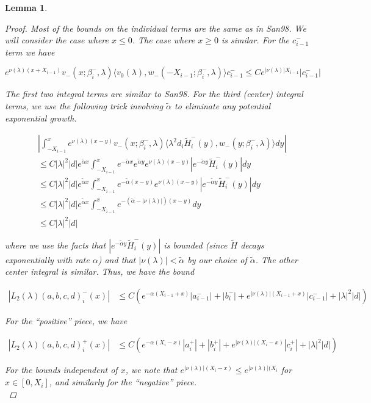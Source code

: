 \documentclass[12pt]{article}
\newtheorem{lemma}{Lemma}
\begin{document}
\begin{lemma}
\begin{proof}
Most of the bounds on the individual terms are the same as in San98. We will consider the case where $x \leq 0$. The case where $x \geq 0$ is similar. For the $c_{i-1}^-$ term we have

\[
e^{\nu(\lambda)(x+X_{i-1})} v_-(x; \beta_i^-, \lambda) \langle v_0(\lambda), w_-(-X_{i-1}; \beta_i^-, \lambda) \rangle c_{i-1}^- \leq C e^{|\nu(\lambda)| X_{i-1} }|c_{i-1}^-|
\]

The first two integral terms are similar to San98. For the third (center) integral terms, we use the following trick involving $\tilde{\alpha}$ to eliminate any potential exponential growth.

\begin{align*}
&\left| \int_{-X_{i-1}}^x 
e^{\nu(\lambda)(x-y)} v_-(x; \beta_i^-, \lambda) \langle \lambda^2 d_i \tilde{H}_i^-(y), w_-(y; \beta_i^-, \lambda) \rangle dy \right| \\
&\leq C |\lambda|^2 |d| e^{\tilde{\alpha}x} \int_{-X_{i-1}}^x e^{-\tilde{\alpha}x} e^{\tilde{\alpha}y} e^{\nu(\lambda)(x-y)} |e^{-\tilde{\alpha}y}\tilde{H}_i^-(y)|dy \\
&\leq C |\lambda|^2 |d| e^{\tilde{\alpha}x} \int_{-X_{i-1}}^x e^{-\tilde{\alpha}(x-y)} e^{\nu(\lambda)(x-y)} |e^{-\tilde{\alpha}y}\tilde{H}_i^-(y)| dy \\
&\leq C |\lambda|^2 |d| e^{\tilde{\alpha}x} \int_{-X_{i-1}}^x e^{-(\tilde{\alpha} - |\nu(\lambda)|)(x-y)} dy \\
&\leq C |\lambda|^2 |d|
\end{align*}

where we use the facts that $|e^{-\tilde{\alpha}y}\tilde{H}_i^-(y)|$ is bounded (since $\tilde{H}$ decays exponentially with rate $\alpha$) and that $|\nu(\lambda)| < \tilde{\alpha}$ by our choice of $\tilde{\alpha}$. The other center integral is similar. Thus, we have the bound 

\begin{align*}
|L_2(\lambda)(a,b,c,d)_i^-(x)| &\leq C (e^{-\alpha(X_{i-1} + x)}|a_{i-1}^-| + |b_i^-| + e^{|\nu(\lambda)|(X_{i-1} + x)} |c_{i-1}^-| + |\lambda|^2 |d| )
\end{align*}

For the ``positive'' piece, we have

\begin{align*}
|L_2(\lambda)(a,b,c,d)_i^+(x)| &\leq C (e^{-\alpha(X_i - x)}|a_i^+| + |b_i^+| + e^{|\nu(\lambda)|(X_i - x)} |c_i^+| + |\lambda|^2 |d| ) 
\end{align*}

For the bounds independent of $x$, we note that $e^{|\nu(\lambda)|(X_i - x)} \leq e^{|\nu(\lambda)|(X_i}$ for $x \in [0, X_i]$, and similarly for the ``negative'' piece.\\

\end{proof}
\end{lemma}
\end{document}
